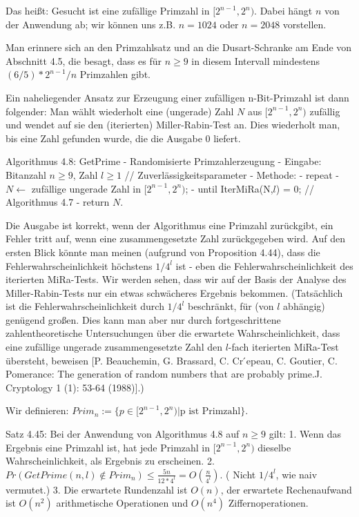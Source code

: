 \documentclass[a4paper]{article}
\begin{document}
\begin{multicols}{3}
{{{Das heißt: Gesucht ist eine zufällige Primzahl in $[2^{n-1}, 2^n)$. Dabei hängt $n$ von der Anwendung ab; wir können uns z.B. $n=1024$ oder $n=2048$ vorstellen.

Man erinnere sich an den Primzahlsatz und an die Dusart-Schranke am Ende von Abschnitt 4.5, die besagt, dass es für $n\geq 9$ in diesem Intervall mindestens $(6/5)*
2^{n-1}/n$ Primzahlen gibt.

Ein naheliegender Ansatz zur Erzeugung einer zufälligen n-Bit-Primzahl ist dann folgender: Man wählt wiederholt eine (ungerade) Zahl $N$ aus $[2^{n-1}, 2^n)$ zufällig und wendet auf sie den (iterierten) Miller-Rabin-Test an. Dies wiederholt man, bis eine Zahl gefunden wurde, die die Ausgabe $0$ liefert.

Algorithmus 4.8: GetPrime - Randomisierte Primzahlerzeugung
- Eingabe: Bitanzahl $n\geq 9$, Zahl $l\geq 1$ // Zuverlässigkeitsparameter
- Methode:
  - repeat
    - $N\leftarrow$ zufällige ungerade Zahl in $[2^{n-1}, 2^n)$;
  - until IterMiRa(N,$l$) = 0; // Algorithmus 4.7
  - return $N$.

Die Ausgabe ist korrekt, wenn der Algorithmus eine Primzahl zurückgibt, ein Fehler tritt auf, wenn eine zusammengesetzte Zahl zurückgegeben wird. Auf den ersten Blick könnte man meinen (aufgrund von Proposition 4.44), dass die Fehlerwahrscheinlichkeit höchstens $1/4^l$ ist - eben die Fehlerwahrscheinlichkeit des iterierten MiRa-Tests. Wir werden sehen, dass wir auf der Basis der Analyse des Miller-Rabin-Tests nur ein etwas schwächeres Ergebnis bekommen. (Tatsächlich ist die Fehlerwahrscheinlichkeit durch $1/4^l$ beschränkt, für (von $l$ abhängig) genügend großen. Dies kann man aber nur durch fortgeschrittene zahlentheoretische Untersuchungen über die erwartete Wahrscheinlichkeit, dass eine zufällige ungerade zusammengesetzte Zahl den $l$-fach iterierten MiRa-Test übersteht, beweisen [P. Beauchemin, G. Brassard, C. Cr ́epeau, C. Goutier, C. Pomerance: The generation of random numbers that are probably prime.J. Cryptology 1 (1): 53-64 (1988)].)

Wir definieren: $Prim_n:=\{p\in [2^{n-1}, 2^n)| \text{p ist Primzahl}\}$.

Satz 4.45: Bei der Anwendung von Algorithmus 4.8 auf $n\geq 9$ gilt:
1. Wenn das Ergebnis eine Primzahl ist, hat jede Primzahl in $[2^{n-1}, 2^n)$ dieselbe Wahrscheinlichkeit, als Ergebnis zu erscheinen.
2. $Pr(GetPrime(n,l)\not\in Prim_n)\leq \frac{5n}{12*4^l}=O(\frac{n}{4^l})$. ( Nicht $1/4^l$, wie naiv vermutet.)
3. Die erwartete Rundenzahl ist $O(n)$, der erwartete Rechenaufwand ist $O(n^2)$ arithmetische Operationen und $O(n^4)$ Ziffernoperationen.

}}}
\end{multicols}
\end{document}
